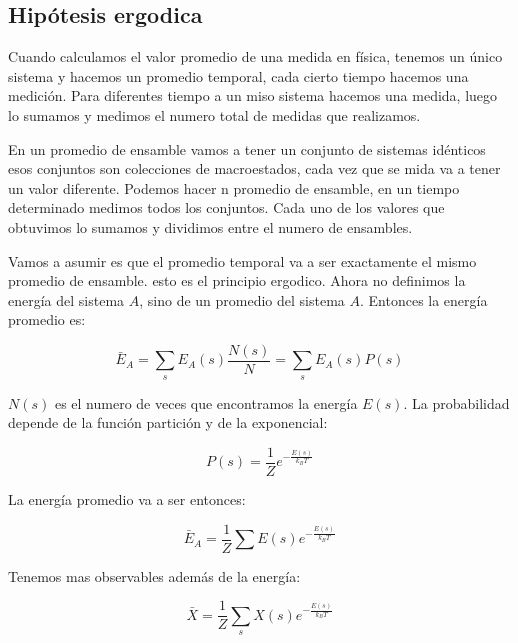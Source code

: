 \documentclass[11pt,fleqn]{book}
\begin{document}
\subsection{Hipótesis ergodica}

Cuando calculamos el valor promedio de una medida en física, tenemos un único sistema y hacemos un promedio temporal, cada cierto tiempo hacemos una medición. Para diferentes tiempo a un miso sistema hacemos una medida, luego lo sumamos y medimos el numero total de medidas que realizamos.


En un promedio de ensamble vamos a tener un conjunto de sistemas idénticos esos conjuntos son colecciones de macroestados, cada vez que se mida va a tener un valor diferente. Podemos hacer n promedio de ensamble, en un tiempo determinado medimos todos los conjuntos. Cada uno de los valores que obtuvimos lo sumamos y dividimos entre el numero de ensambles.


Vamos a asumir es que el promedio temporal va a ser exactamente el mismo promedio de ensamble. esto es el principio ergodico. Ahora no definimos la energía del sistema $A$, sino de un promedio del sistema $A$. Entonces la energía promedio es:

\begin{equation*}
    \bar{E}_{A}=\sum_{s}E_{A}(s)\frac{N(s)}{N}=\sum_{s}E_{A}(s)P(s)
\end{equation*}

$N(s)$ es el numero de veces que encontramos la energía $E(s)$. La probabilidad depende de la función partición y de la exponencial:

\begin{equation}
        P(s)=\frac{1}{Z}e^{-\frac{E(s)}{k_{B}T}}
        \label{Eq. 4.11}
\end{equation}

La energía promedio va a ser entonces:

\begin{equation}
\bar{E}_{A}=\frac{1}{Z}\sum E(s)e^{-\frac{E(s)}{k_{B}T}}
    \label{Eq. 4.12}
\end{equation}

Tenemos mas observables además de la energía:

\begin{equation}
    \bar{X}=\frac{1}{Z}\sum_{s} X(s)e^{-\frac{E(s)}{k_{B}T}}
    \label{Eq. 4.13}
\end{equation}
\end{document}
